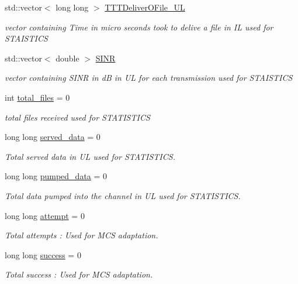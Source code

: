 \begin{DoxyCompactItemize}
std\-::vector$<$ long long $>$ \hyperlink{classSTA_a74581a3136b0942d2addb54b75da49ff}{T\-T\-T\-Deliver\-O\-File\-\_\-\-U\-L}
\begin{DoxyCompactList}\small\item\em vector containing Time in micro seconds took to delive a file in I\-L used for S\-T\-A\-I\-S\-T\-I\-C\-S \end{DoxyCompactList}\item 
std\-::vector$<$ double $>$ \hyperlink{classSTA_a8d180b4c6fda9f084bea3d396e66532c}{S\-I\-N\-R}
\begin{DoxyCompactList}\small\item\em vector containing S\-I\-N\-R in d\-B in U\-L for each transmission used for S\-T\-A\-I\-S\-T\-I\-C\-S \end{DoxyCompactList}\item 
int \hyperlink{classSTA_a16afe91328cf843a216a5a67808eaecb}{total\-\_\-files} = 0
\begin{DoxyCompactList}\small\item\em total files received used for S\-T\-A\-T\-I\-S\-T\-I\-C\-S \end{DoxyCompactList}\item 
long long \hyperlink{classSTA_ac25732c1d2f29de2f5cd3cfc65fcb559}{served\-\_\-data} = 0
\begin{DoxyCompactList}\small\item\em Total served data in U\-L used for S\-T\-A\-T\-I\-S\-T\-I\-C\-S. \end{DoxyCompactList}\item 
long long \hyperlink{classSTA_ae42a5d6c3c4f06388c9dae400b8d2661}{pumped\-\_\-data} = 0
\begin{DoxyCompactList}\small\item\em Total data pumped into the channel in U\-L used for S\-T\-A\-T\-I\-S\-T\-I\-C\-S. \end{DoxyCompactList}\item 
long long \hyperlink{classSTA_a4cfeac60ce7a13a4bbae68b756655dc9}{attempt} = 0
\begin{DoxyCompactList}\small\item\em Total attempts \-: Used for M\-C\-S adaptation. \end{DoxyCompactList}\item 
long long \hyperlink{classSTA_a8f2d6be8326b3e46fbf1599040bff750}{success} = 0
\begin{DoxyCompactList}\small\item\em Total success \-: Used for M\-C\-S adaptation. \end{DoxyCompactList}\item 

\end{DoxyCompactItemize}
